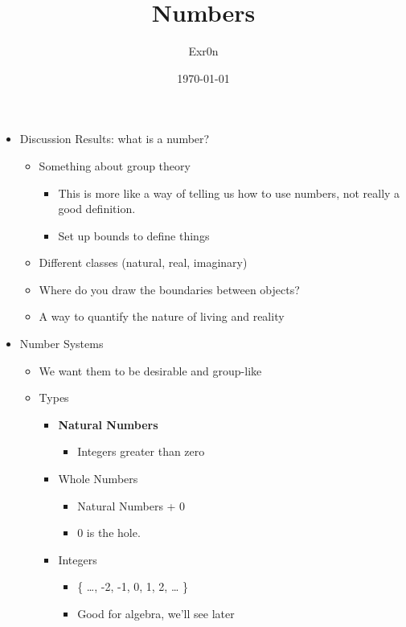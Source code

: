 \documentclass[letterpaper]{article}
\author{Exr0n}
\date{\today}
\title{Numbers}
\renewcommand\maketitle{}
\begin{document}
\maketitle
\begin{itemize}
\item Discussion Results: what is a number?

\begin{itemize}
\item Something about group theory

\begin{itemize}
\item This is more like a way of telling us how to use numbers, not
really a good definition.
\item Set up bounds to define things
\end{itemize}

\item Different classes (natural, real, imaginary)
\item Where do you draw the boundaries between objects?
\item A way to quantify the nature of living and reality
\end{itemize}

\item Number Systems

\begin{itemize}
\item We want them to be desirable and group-like
\item Types

\begin{itemize}
\item \textbf{Natural Numbers}

\begin{itemize}
\item Integers greater than zero
\end{itemize}

\item Whole Numbers

\begin{itemize}
\item Natural Numbers + 0
\item 0 is the hole.
\end{itemize}

\item Integers

\begin{itemize}
\item \{ \ldots{}, -2, -1, 0, 1, 2, \ldots{} \}
\item Good for algebra, we'll see later
\end{itemize}


\end{itemize}
\end{itemize}
\end{itemize}
\end{document}
